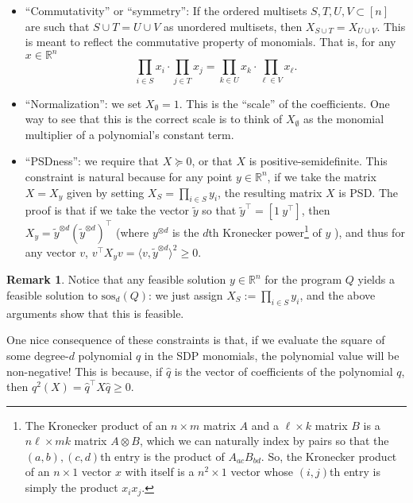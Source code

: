 \documentclass[a4paper,11pt]{article}
\newcommand{\R}{\mathbb{R}}
\newcommand{\sos}{\mathrm{sos}}
\theoremstyle{definition}
\newtheorem{remark}{Remark}
\begin{document}
\begin{itemize}
\item ``Commutativity'' or ``symmetry'': If the ordered multisets $S,T,U,V \subset [n]$ are such that $S \cup T = U \cup V$ as unordered multisets, then $X_{S\cup T} = X_{U \cup V}$.
This is meant to reflect the commutative property of monomials.
That is, for any $x\in \R^n$
\[
\prod_{i \in S}x_i \cdot \prod_{j\in T}x_j = \prod_{k \in U}x_k \cdot \prod_{\ell \in V} x_{\ell}.
\]
\item ``Normalization'': we set $X_{\emptyset} = 1$.
This is the ``scale'' of the coefficients.
One way to see that this is the correct scale is to think of $X_{\emptyset}$ as the monomial multiplier of a polynomial's constant term.
\item ``PSDness'': we require that $X \succeq 0$, or that $X$ is positive-semidefinite.
This constraint is natural because for any point $y \in \R^n$, if we take the matrix $X=X_y$ given by setting $X_{S} = \prod_{i\in S} y_i$, the resulting matrix $X$ is PSD.
The proof is that if we take the vector $\tilde{y}$ so that $\tilde{y}^{\top} = [1 \ y^\top]$, then $X_y = \tilde{y}^{\otimes d}(\tilde{y}^{\otimes d})^\top$ (where $y^{\otimes d}$ is the $d$th Kronecker power\footnote{The Kronecker product of an $n \times m$ matrix $A$ and a $\ell \times k$ matrix $B$ is a $n\ell \times mk$ matrix $A \otimes B$, which we can naturally index by pairs so that the $(a,b),(c,d)$th entry is the product of $A_{ac}B_{bd}$.
So, the Kronecker product of an $n \times 1$ vector $x$ with itself is a $n^2 \times 1$ vector whose $(i,j)$th entry is simply the product $x_ix_j$.}
of $y$
), and thus for any vector $v$, $v^\top X_yv = \langle v, \tilde{y}^{\otimes d}\rangle^2 \ge 0$.

\end{itemize}

\begin{remark}
Notice that any feasible solution $y \in \R^n$ for the program $Q$ yields a feasible solution to $\sos_d(Q)$: we just assign $X_S := \prod_{i\in S}y_i$, and the above arguments show that this is feasible.
\end{remark}

One nice consequence of these constraints is that, if we evaluate the square of some degree-$d$ polynomial $q$ in the SDP monomials, the polynomial value will be non-negative!
This is because, if $\hat q$ is the vector of coefficients of the polynomial $q$, then $q^2(X) = \hat{q}^\top X \hat{q} \ge 0$.
\end{document}
